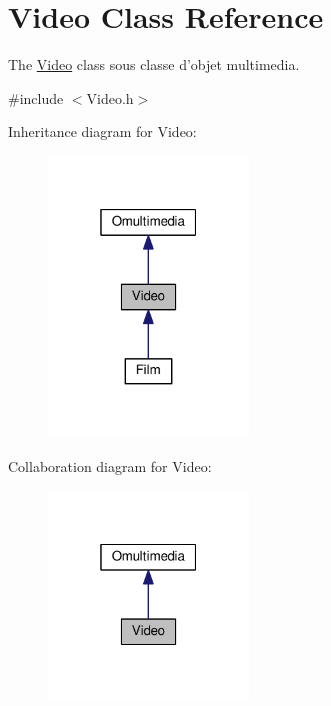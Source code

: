 \hypertarget{class_video}{\section{Video Class Reference}
\label{class_video}
}


The \hyperlink{class_video}{Video} class sous classe d'objet multimedia.  




{\ttfamily \#include $<$Video.\+h$>$}



Inheritance diagram for Video\+:
\nopagebreak
\begin{figure}[H]
\begin{center}
\leavevmode
\includegraphics[width=151pt]{class_video__inherit__graph}
\end{center}
\end{figure}


Collaboration diagram for Video\+:
\nopagebreak
\begin{figure}[H]
\begin{center}
\leavevmode
\includegraphics[width=151pt]{class_video__coll__graph}
\end{center}
\end{figure}
